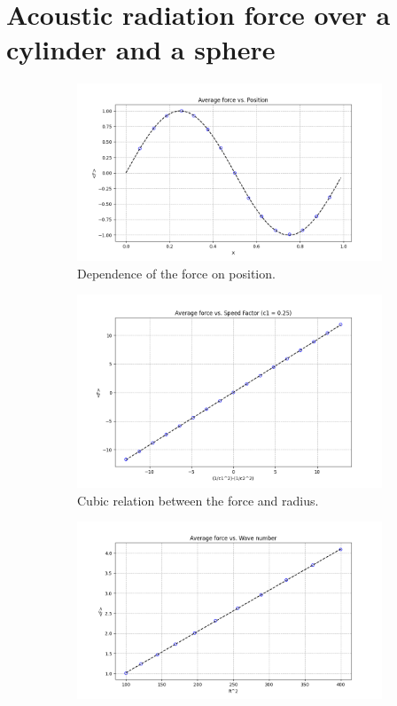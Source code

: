 \chapter{Acoustic radiation force over a cylinder and a sphere}

\begin{figure}
    \begin{subfigure}{0.4\textwidth}
    \centering
    \includegraphics[width=\textwidth]{images/Results/Position2D.png}
    \caption{Dependence of the force on position.}
    \label{fig:position}
    \end{subfigure}
    \begin{subfigure}{0.35\textwidth}
    \centering
    \includegraphics[width=\textwidth]{images/Results/Speed_C1_025.png}
    \caption{Cubic relation between the force and radius.}
    \label{fig:radius}
    \end{subfigure}
    \begin{subfigure}{0.4\textwidth}
    \centering
    \includegraphics[width=\textwidth]{images/Results/radius2D.png}

\end{subfigure}
\end{figure}
